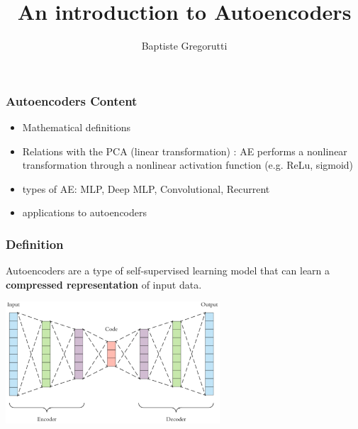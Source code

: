 \documentclass[11pt,a4paper]{beamer}
\title[Autoencoder]{An introduction to Autoencoders}
\author{Baptiste Gregorutti}
\begin{document}
\begin{frame}
\bigskip
\maketitle
\end{frame}

\begin{frame}
	\frametitle{Autoencoders Content}

	\begin{itemize}
		\item Mathematical definitions
		\item Relations with the PCA (linear transformation) : AE performs a nonlinear transformation through a nonlinear activation function (e.g. ReLu, sigmoid)
		\item types of AE: MLP, Deep MLP, Convolutional, Recurrent
		\item applications to autoencoders
	\end{itemize}

\end{frame}




\begin{frame}
	\frametitle{Definition}

	\begin{block}{}
	Autoencoders are a type of self-supervised learning model that can learn a \textbf{compressed representation} of input data.
	\end{block}

	\bigskip
	\centering
	\includegraphics[width = 0.6\textwidth]{figures/AE.png}

\end{frame}
\end{document}
